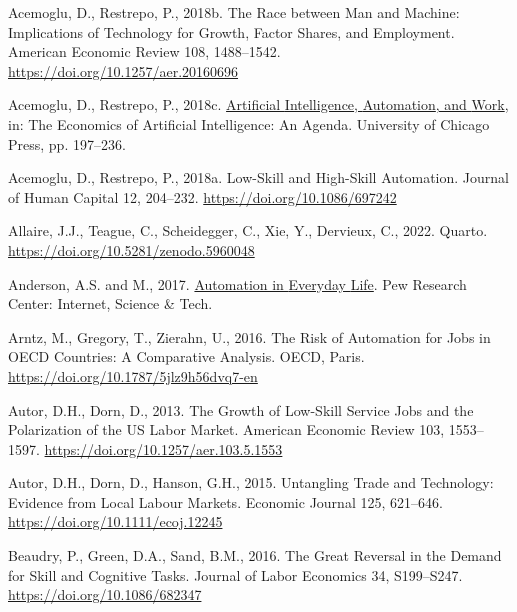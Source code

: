 \documentclass[
  12pt,
  a4paperpaper,
]{article}
\newlength{\cslhangindent}
\newenvironment{CSLReferences}[2] %
 {\begin{list}{}{%
  \setlength{\itemindent}{0pt}
  \setlength{\leftmargin}{0pt}
  \setlength{\parsep}{0pt}
  \ifodd #1
   \setlength{\leftmargin}{\cslhangindent}
   \setlength{\itemindent}{-1\cslhangindent}
  \fi
  \setlength{\itemsep}{#2\baselineskip}}}
 {\end{list}}
\begin{document}
\begin{CSLReferences}{1}{0}
Acemoglu, D., Restrepo, P., 2018b. The {Race} between {Man} and
{Machine}: {Implications} of {Technology} for {Growth}, {Factor}
{Shares}, and {Employment}. American Economic Review 108, 1488--1542.
\url{https://doi.org/10.1257/aer.20160696}

Acemoglu, D., Restrepo, P., 2018c.
\href{https://www.nber.org/books-and-chapters/economics-artificial-intelligence-agenda/artificial-intelligence-automation-and-work}{Artificial
{Intelligence}, {Automation}, and {Work}}, in: The {Economics} of
{Artificial} {Intelligence}: {An} {Agenda}. University of Chicago Press,
pp. 197--236.

Acemoglu, D., Restrepo, P., 2018a. Low-{Skill} and {High}-{Skill}
{Automation}. Journal of Human Capital 12, 204--232.
\url{https://doi.org/10.1086/697242}

Allaire, J.J., Teague, C., Scheidegger, C., Xie, Y., Dervieux, C., 2022.
Quarto. \url{https://doi.org/10.5281/zenodo.5960048}

Anderson, A.S. and M., 2017.
\href{https://www.pewresearch.org/internet/2017/10/04/automation-in-everyday-life/}{Automation
in {Everyday} {Life}}. Pew Research Center: Internet, Science \& Tech.

Arntz, M., Gregory, T., Zierahn, U., 2016. The {Risk} of {Automation}
for {Jobs} in {OECD} {Countries}: {A} {Comparative} {Analysis}. OECD,
Paris. \url{https://doi.org/10.1787/5jlz9h56dvq7-en}

Autor, D.H., Dorn, D., 2013. The {Growth} of {Low}-{Skill} {Service}
{Jobs} and the {Polarization} of the {US} {Labor} {Market}. American
Economic Review 103, 1553--1597.
\url{https://doi.org/10.1257/aer.103.5.1553}

Autor, D.H., Dorn, D., Hanson, G.H., 2015. Untangling {Trade} and
{Technology}: {Evidence} from {Local} {Labour} {Markets}. Economic
Journal 125, 621--646. \url{https://doi.org/10.1111/ecoj.12245}

Beaudry, P., Green, D.A., Sand, B.M., 2016. The {Great} {Reversal} in
the {Demand} for {Skill} and {Cognitive} {Tasks}. Journal of Labor
Economics 34, S199--S247. \url{https://doi.org/10.1086/682347}


\end{CSLReferences}
\end{document}
